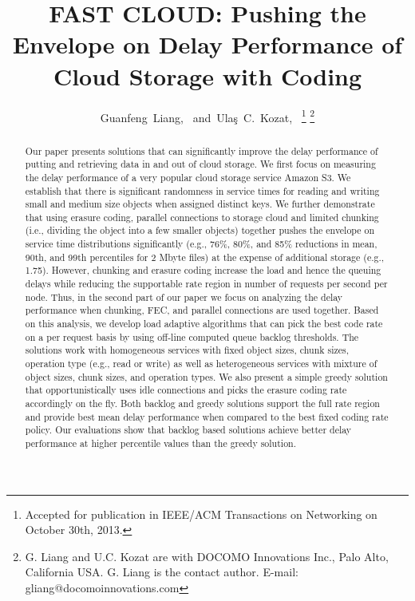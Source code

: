 \documentclass[journal]{IEEEtran}
\begin{document}
\title{FAST CLOUD: Pushing the Envelope on Delay Performance of Cloud Storage with Coding}


\author{Guanfeng~Liang,~
        and~Ula\c{s}~C.~Kozat,~
\thanks{Accepted for publication in IEEE/ACM Transactions on Networking on October 30th, 2013.}
\thanks{G. Liang and U.C. Kozat are with DOCOMO Innovations Inc., Palo Alto, California USA. G. Liang is the contact author. E-mail: gliang@docomoinnovations.com}
}
\maketitle


\begin{abstract}
Our paper presents solutions that can significantly improve the delay performance of putting and retrieving data in and out of cloud storage. We first focus on measuring the delay performance of a very popular cloud storage service Amazon S3. We establish that there is significant randomness in service times for reading and writing small and medium size objects when assigned distinct keys. We further demonstrate that using erasure coding, parallel connections to storage cloud and limited chunking (i.e., dividing the object into a few smaller objects)  together pushes the envelope on service time distributions significantly (e.g., 76\%, 80\%, and 85\% reductions in mean, 90th, and 99th percentiles for 2 Mbyte files) at the expense of additional storage (e.g., 1.75). However, chunking and erasure coding increase the load and hence the queuing delays while reducing the supportable rate region in number of requests per second per node. Thus, in the second part of our paper we focus on analyzing the delay performance when chunking, FEC, and parallel connections are used together. Based on this analysis, we develop load adaptive algorithms that can pick the best code rate on a per request basis by using off-line computed queue backlog thresholds. The solutions work with homogeneous services with fixed object sizes, chunk sizes, operation type (e.g., read or write) as well as heterogeneous services with mixture of object sizes, chunk sizes, and operation types. We also present a simple greedy solution that opportunistically uses idle connections and picks the erasure coding rate accordingly on the fly. Both backlog and greedy solutions support the full rate region and provide best mean delay performance when compared to the best fixed coding rate policy. Our evaluations show that backlog based solutions achieve better delay performance at higher percentile values than the greedy solution.

\end{abstract}
\end{document}
